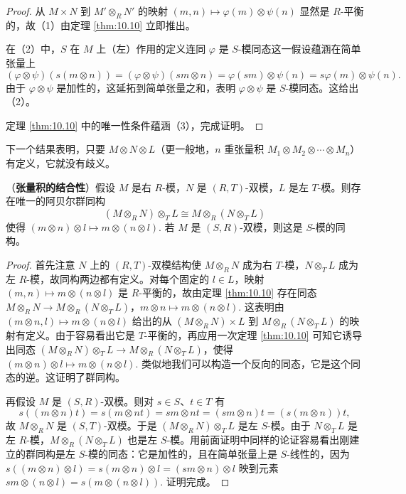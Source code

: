 \begin{proof}
从 \(M \times N\) 到 \(M' \otimes_R N'\) 的映射 \((m, n) \mapsto \varphi(m) \otimes \psi(n)\) 显然是 \(R\)-平衡的，故（1）由定理 \ref{thm:10.10} 立即推出。

在（2）中，\(S\) 在 \(M\) 上（左）作用的定义连同 \(\varphi\) 是 \(S\)-模同态这一假设蕴涵在简单张量上
\[
(\varphi \otimes \psi)(s(m \otimes n)) = (\varphi \otimes \psi)(sm \otimes n) = \varphi(sm) \otimes \psi(n) = s\varphi(m) \otimes \psi(n).
\]
由于 \(\varphi \otimes \psi\) 是加性的，这延拓到简单张量之和，表明 \(\varphi \otimes \psi\) 是 \(S\)-模同态。这给出（2）。

定理 \ref{thm:10.10} 中的唯一性条件蕴涵（3），完成证明。
\end{proof}

下一个结果表明，只要 \(M \otimes N \otimes L\)（更一般地，\(n\) 重张量积 \(M_1 \otimes M_2 \otimes \cdots \otimes M_n\)）有定义，它就没有歧义。

\begin{theorem}\label{thm:10.14}
（\textbf{张量积的结合性}）假设 \(M\) 是右 \(R\)-模，\(N\) 是 \((R, T)\)-双模，\(L\) 是左 \(T\)-模。则存在唯一的阿贝尔群同构
\[
(M \otimes_R N) \otimes_T L \cong M \otimes_R (N \otimes_T L)
\]
使得 \((m \otimes n) \otimes l \mapsto m \otimes (n \otimes l)\). 若 \(M\) 是 \((S, R)\)-双模，则这是 \(S\)-模的同构。
\end{theorem}

\begin{proof}
首先注意 \(N\) 上的 \((R, T)\)-双模结构使 \(M \otimes_R N\) 成为右 \(T\)-模，\(N \otimes_T L\) 成为左 \(R\)-模，故同构两边都有定义。对每个固定的 \(l \in L\)，映射 \((m, n) \mapsto m \otimes (n \otimes l)\) 是 \(R\)-平衡的，故由定理 \ref{thm:10.10} 存在同态 \(M \otimes_R N \to M \otimes_R (N \otimes_T L)\)，\(m \otimes n \mapsto m \otimes (n \otimes l)\). 这表明由 \((m \otimes n, l) \mapsto m \otimes (n \otimes l)\) 给出的从 \((M \otimes_R N) \times L\) 到 \(M \otimes_R (N \otimes_T L)\) 的映射有定义。由于容易看出它是 \(T\)-平衡的，再应用一次定理 \ref{thm:10.10} 可知它诱导出同态 \((M \otimes_R N) \otimes_T L \to M \otimes_R (N \otimes_T L)\)，使得 \((m \otimes n) \otimes l \mapsto m \otimes (n \otimes l)\). 类似地我们可以构造一个反向的同态，它是这个同态的逆。这证明了群同构。

再假设 \(M\) 是 \((S, R)\)-双模。则对 \(s \in S\)、\(t \in T\) 有
\[
s((m \otimes n)t) = s(m \otimes nt) = sm \otimes nt = (sm \otimes n)t = (s(m \otimes n))t,
\]
故 \(M \otimes_R N\) 是 \((S, T)\)-双模。于是 \((M \otimes_R N) \otimes_T L\) 是左 \(S\)-模。由于 \(N \otimes_T L\) 是左 \(R\)-模，\(M \otimes_R (N \otimes_T L)\) 也是左 \(S\)-模。用前面证明中同样的论证容易看出刚建立的群同构是左 \(S\)-模的同态：它是加性的，且在简单张量上是 \(S\)-线性的，因为 \(s((m \otimes n) \otimes l) = s(m \otimes n) \otimes l = (sm \otimes n) \otimes l\) 映到元素 \(sm \otimes (n \otimes l) = s(m \otimes (n \otimes l))\). 证明完成。
\end{proof}

